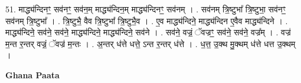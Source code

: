 \documentclass[17pt]{extarticle}
\begin{document}
51. माद्ध्य॑न्दिनꣳ॒॒ सव॑नꣳ॒॒ सव॑न॒म् माद्ध्य॑न्दिन॒म् माद्ध्य॑न्दिनꣳ॒॒ सव॑नम् । . सव॑नम् त्रि॒ष्टुभा᳚ त्रि॒ष्टुभा॒ सव॑नꣳ॒॒ सव॑नम् त्रि॒ष्टुभा᳚ । . त्रि॒ष्टुभै॒ वैव त्रि॒ष्टुभा᳚ त्रि॒ष्टुभै॒व । . ए॒व माद्ध्य॑न्दिने॒ माद्ध्य॑न्दिन ए॒वैव माद्ध्य॑न्दिने । . माद्ध्य॑न्दिने॒ सव॑ने॒ सव॑ने॒ माद्ध्य॑न्दिने॒ माद्ध्य॑न्दिने॒ सव॑ने । . सव॑ने॒ वज्रं॒ ॅवज्रꣳ॒॒ सव॑ने॒ सव॑ने॒ वज्र᳚म् । . वज्र॑ म॒न्त र॒न्तर् वज्रं॒ ॅवज्र॑ म॒न्तः । . अ॒न्तर् ध॑त्ते धत्ते॒ ऽन्त र॒न्तर् ध॑त्ते । . ध॒त्त॒ उ॒क्थ मु॒क्थम् ध॑त्ते धत्त उ॒क्थम् । \newline

\textbf{Ghana Paata } \newline
\end{document}
